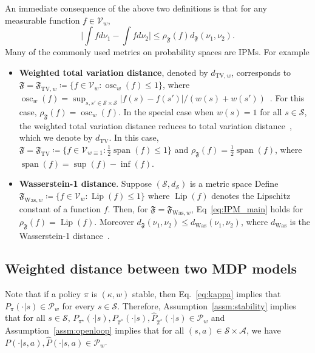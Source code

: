 \documentclass[letterpaper, 10pt]{IEEEtran}
\newcommand*\ALPHABET{\mathcal}
\newcommand*\tuple{\kappa, w}
\newcommand\F{\mathfrak{F}}
\newcommand\FTV{\F_{\mathrm{TV}}}
\newcommand\dTV{d_{\mathrm{TV}}}
\newcommand\dTVw{d_{\mathrm{TV},w}}
\newcommand\dWas{d_{\mathrm{Was}}}
\newcommand\FTVw{\F_{\mathrm{TV},w}}
\newcommand\FWasw{\F_{\mathrm{Was},w}}
\DeclareMathOperator{\Lip}{Lip}
\DeclareMathOperator{\Span}{span}
\DeclareMathOperator{\Osc}{osc}
\begin{document}
An immediate consequence of the above two definitions is that for any measurable function $f \in \ALPHABET V_w$,
\begin{equation}\label{eq:IPM_main}
    \biggl| \int f d\nu_1 - \int f d\nu_2 \biggr| \leq \rho_{\F}(f)d_{\F}(\nu_1,\nu_2).
\end{equation}
Many of the commonly used metrics on probability spaces are IPMs. For example

\begin{itemize}
    \item \textbf{Weighted total variation distance}, denoted by $\dTVw$, corresponds to $\F = \FTVw \coloneqq \{ f \in \ALPHABET V_w: \Osc_w(f) \le 1 \}$, where $\Osc_w(f) = \sup_{s,s' \in \ALPHABET S \times \ALPHABET S}| f(s) - f(s')|/(w(s) + w(s'))$~\cite{douc2018markov,hairer2011yet,meyn1992stability}. For this case, $\rho_{\F}(f) = \Osc_w(f)$. 
    In the special case when $w(s) = 1$ for all $s \in \ALPHABET S$, the weighted total variation distance reduces to total variation distance~\cite{muller1997,villani2009optimal}, which we denote by $\dTV$. In this case,  $\F = \FTV \coloneqq \{ f \in \ALPHABET V_{w\equiv1} : \tfrac 12\Span(f) \le 1 \}$ and $\rho_{\F}(f) = \tfrac 12 \Span(f)$, where $\Span(f) = \sup(f) - \inf(f)$.
    
    \item \textbf{Wasserstein-1 distance}. Suppose $(\ALPHABET S, d_{\ALPHABET S})$ is a metric space  
    Define $\FWasw \coloneqq \{ f \in \ALPHABET V_w : \Lip(f) \le 1 \}$ where  $\Lip(f)$ denotes the Lipschitz constant of a function $f$. 
    Then, for $\F = \FWasw$, Eq~\eqref{eq:IPM_main} holds for $\rho_{\F}(f) = \Lip(f)$. Moreover $d_{\F}(\nu_1, \nu_2) \le \dWas(\nu_1, \nu_2)$, where $\dWas$ is the Wasserstein-1 distance~\cite{vaserstein1969markov,villani2009optimal}. 
\end{itemize}

\subsection{Weighted distance between two MDP models}
Note that if a policy $\pi$ is $(\tuple)$ stable, then Eq.~\eqref{eq:kappa} implies that $P_\pi(\cdot | s) \in \ALPHABET P_w$ for every $s \in \ALPHABET S$. Therefore, Assumption~\ref{assm:stability} implies that
for all $s \in \ALPHABET S$,  $P_{\pi^\star}(\cdot | s), P_{\hat \pi^\star}(\cdot | s), \hat P_{\hat \pi^\star}(\cdot | s) \in \ALPHABET P_w$ and Assumption~\ref{assm:openloop} implies that for all $(s,a) \in \ALPHABET S \times \ALPHABET A$, we have  $P(\cdot | s,a), \hat P(\cdot | s,a) \in \ALPHABET P_w$.
\end{document}

